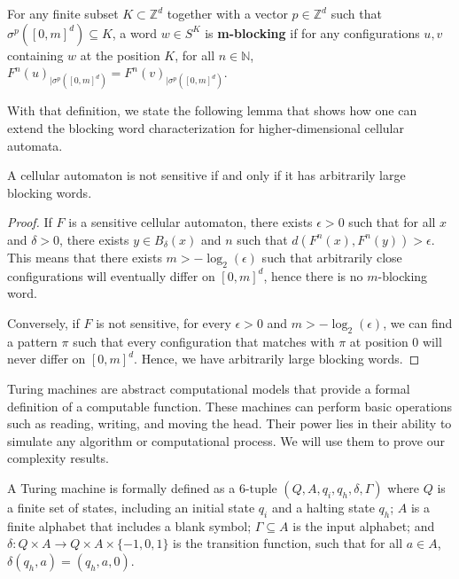 \documentclass{llncs}
\begin{document}
\begin{definition}
For any finite subset $K \subset \mathbb{Z}^d$ together with a vector $p\in \mathbb {Z}^d$ such that $\sigma^p ([0, m]^d) \subseteq K$, a word $w \in S^K$ is \textbf{m-blocking} if for any configurations $u,v$ containing $w$ at the position $K$, for all $n \in \mathbb{N}$, $F^n(u)_{|\sigma^p([0, m]^d)} = F^n(v)_{|\sigma^p([0, m]^d)}$.
\end{definition}


With that definition, we state the following lemma that shows how one can extend the blocking word characterization for higher-dimensional cellular automata.

\begin{lemma}\label{lemma:blocking-words}
A cellular automaton is not sensitive if and only if it has arbitrarily large blocking words.
\end{lemma}

\begin{proof}
If $F$ is a sensitive cellular automaton, there exists $\epsilon > 0$ such that for all $x$ and $\delta > 0$, there exists $y \in B_{\delta}(x)$ and $n$ such that $d(F^n(x), F^n(y)) > \epsilon$. This means that there exists $m > -\log_2(\epsilon)$ such that arbitrarily close configurations will eventually differ on $[0, m]^d$, hence there is no $m$-blocking word.

Conversely, if $F$ is not sensitive, for every $\epsilon > 0$ and $m > -\log_2(\epsilon)$, we can find a pattern $\pi$ such that every configuration that matches with $\pi$ at position $0$ will never differ on $[0, m]^d$. Hence, we have arbitrarily large blocking words.    
\end{proof}

Turing machines are abstract computational models that provide a formal definition of a computable function. These machines can perform basic operations such as reading, writing, and moving the head. Their power lies in their ability to simulate any algorithm or computational process. We will use them to prove our complexity results.

A Turing machine is formally defined as a 6-tuple \((Q, A, q_i, q_h, \delta, \Gamma)\) where $Q$ is a finite set of states, including an initial state $q_i$ and a halting state $q_h$; $A$ is a finite alphabet that includes a blank symbol; $\Gamma \subseteq A$ is the input alphabet; and $\delta: Q \times A \to Q \times A \times \{-1, 0, 1\}$ is the transition function, such that for all $a \in A$, $\delta(q_h, a) = (q_h, a, 0)$.
\end{document}

